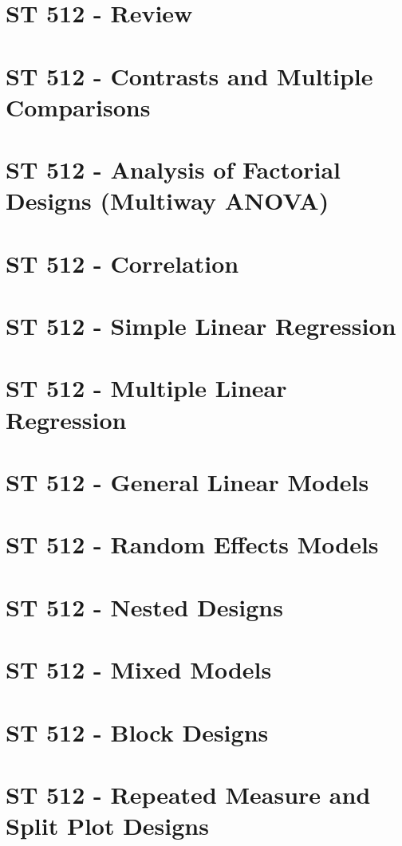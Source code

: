\documentclass{report}
\begin{document}
\setlength{\topmargin}{0pt}
\setlength{\oddsidemargin}{0pt}
\tableofcontents

\newpage
{}


\chapter{ST 512 - Review}

\chapter{ST 512 - Contrasts and Multiple Comparisons}

\chapter{ST 512 - Analysis of Factorial Designs (Multiway ANOVA)}

\chapter{ST 512 - Correlation}

\chapter{ST 512 - Simple Linear Regression}

\chapter{ST 512 - Multiple Linear Regression}

\chapter{ST 512 - General Linear Models}

\chapter{ST 512 - Random Effects Models}

\chapter{ST 512 - Nested Designs}

\chapter{ST 512 - Mixed Models}

\chapter{ST 512 - Block Designs}

\chapter{ST 512 - Repeated Measure and Split Plot Designs}

\end{document}
